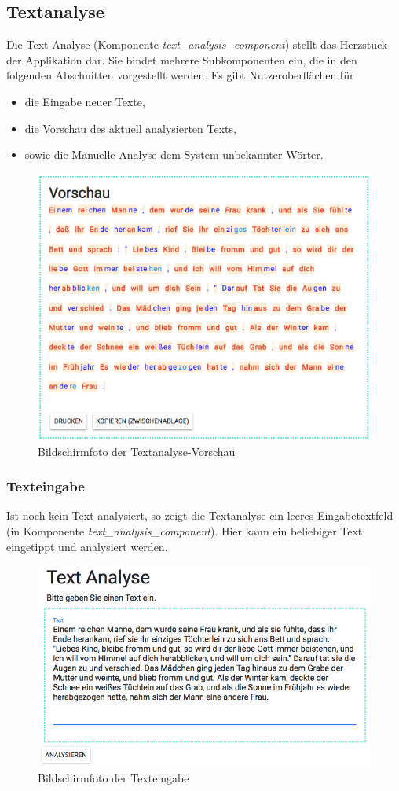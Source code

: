 \subsection{Textanalyse}

Die Text Analyse (Komponente \textit{text\_analysis\_component}) stellt das Herzstück der Applikation dar. Sie bindet mehrere Subkomponenten ein, die in den folgenden Abschnitten vorgestellt werden. Es gibt Nutzeroberflächen für
\begin{itemize}
	\item die Eingabe neuer Texte,
	\item die Vorschau des aktuell analysierten Texts,
	\item sowie die Manuelle Analyse dem System unbekannter Wörter.
\end{itemize}

\begin{figure}[h!]
	\centering
	\includegraphics[width=.5\linewidth]{figures/frontend/textvorschau}
	\caption{Bildschirmfoto der Textanalyse-Vorschau}
	\label{fig:frontend-textanalyse}
\end{figure}

\subsubsection{Texteingabe}

Ist noch kein Text analysiert, so zeigt die Textanalyse ein leeres Eingabetextfeld (in Komponente \textit{text\_analysis\_component}). Hier kann ein beliebiger Text eingetippt und analysiert werden.

\begin{figure}[h!]
	\centering
	\includegraphics[width=.6\linewidth, frame]{figures/frontend/texteingabe}
	\caption{Bildschirmfoto der Texteingabe}
	\label{fig:frontend-texteingabe}
\end{figure}


